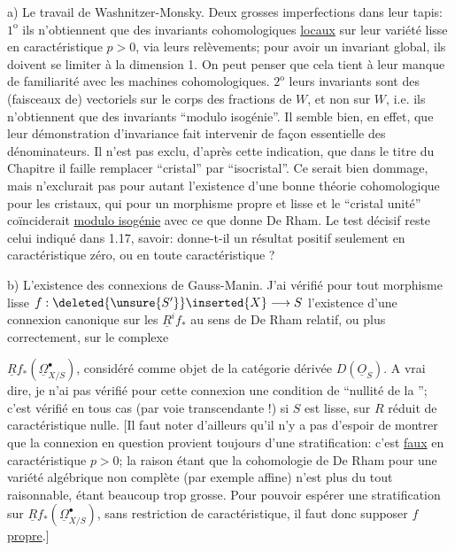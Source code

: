 a) Le travail de Washnitzer-Monsky. Deux grosses imperfections dans leur tapis: $1^{\mathrm{o}}$ ils n'obtiennent que des invariants cohomologiques \uline{locaux} sur leur variété lisse en caractéristique $p>0$, via leurs relèvements; pour avoir un invariant global, ils doivent se limiter à la dimension 1. On peut penser que cela tient à leur manque de familiarité avec les machines cohomologiques. $2^{\mathrm{o}}$ leurs invariants sont des (faisceaux de) vectoriels sur le corps des fractions de $W$, et non sur $W$, i.e. ils n'obtiennent que des invariants ``modulo isogénie''. Il semble bien, en effet, que leur démonstration d'invariance fait intervenir de façon  essentielle des dénominateurs. Il n'est pas exclu, d'après cette indication, que dans le titre du Chapitre il faille remplacer ``cristal'' par ``isocristal''. Ce serait bien dommage, mais n'exclurait pas pour autant l'existence d'une bonne théorie cohomologique pour les cristaux, qui pour un morphisme propre et lisse et le ``cristal unité'' coïnciderait \uline{modulo isogénie} avec ce que donne De Rham. Le test décisif reste celui indiqué dans 1.17, savoir: donne-t-il un résultat positif seulement en caractéristique zéro, ou en toute caractéristique ?

b) L'existence des connexions de Gauss-Manin.  J'ai vérifié pour tout morphisme lisse $f:\deleted{\unsure{S'}}\inserted{X}\longrightarrow S$ l'existence d'une connexion canonique  sur les $\underline{R}^if_*$ au sens de De Rham relatif, ou plus correctement, sur le complexe


$\underline{R}f_*(\underline{\Omega}^{\bullet}_{X/S})$, considéré comme objet de la catégorie dérivée $D(\underline{O}_S)$. A vrai dire, je n'ai pas vérifié pour cette connexion une condition de ``nullité de la  ''; c'est  vérifié en tous cas (par voie transcendante !) si $S$ est lisse, sur $R$ réduit de caractéristique nulle. [Il faut noter d'ailleurs qu'il n'y a pas d'espoir de montrer que la connexion en question provient toujours d'une stratification: c'est \uline{faux} en caractéristique $p>0$; la raison étant que la cohomologie de De Rham pour une variété algébrique non complète (par exemple affine) n'est plus du tout raisonnable, étant beaucoup trop grosse. Pour pouvoir espérer une stratification sur $\underline{R}f_*(\underline{\Omega}^{\bullet}_{X/S})$, sans restriction de caractéristique, il faut donc supposer $f$ \uline{propre}.]

